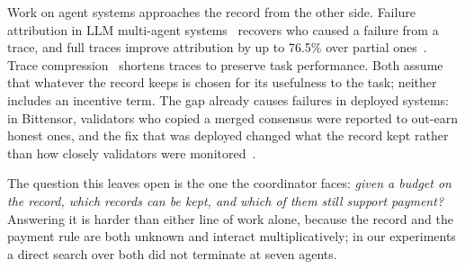 \documentclass[sigconf,anonymous,acmthm=false]{acmart}
\theoremstyle{acmplain}
\theoremstyle{acmdefinition}
\begin{document}
Work on agent systems approaches the record from the other side. Failure attribution in
LLM multi-agent systems~\cite{zhang2025which,zhang2025agentracer,cemri2025fail} recovers
who caused a failure from a trace, and full traces improve attribution by up to 76.5\%
over partial ones~\cite{chen2026elephant}. Trace compression~\cite{hong2026trace,lin2026tracer}
shortens traces to preserve task performance. Both assume that whatever the record keeps
is chosen for its usefulness to the task; neither includes an incentive term. The gap
already causes failures in deployed systems: in Bittensor, validators who copied a
merged consensus were reported to out-earn honest ones, and the fix that was deployed
changed what the record kept rather than how closely validators were
monitored~\cite{opentensor2024weightcopy,liu2024bittensor,opentensor2025commit}.

The question this leaves open is the one the coordinator faces: \emph{given a budget on
the record, which records can be kept, and which of them still support payment?}
Answering it is harder than either line of work alone, because the record and the
payment rule are both unknown and interact multiplicatively; in our experiments a direct
search over both did not terminate at seven agents.
\end{document}
